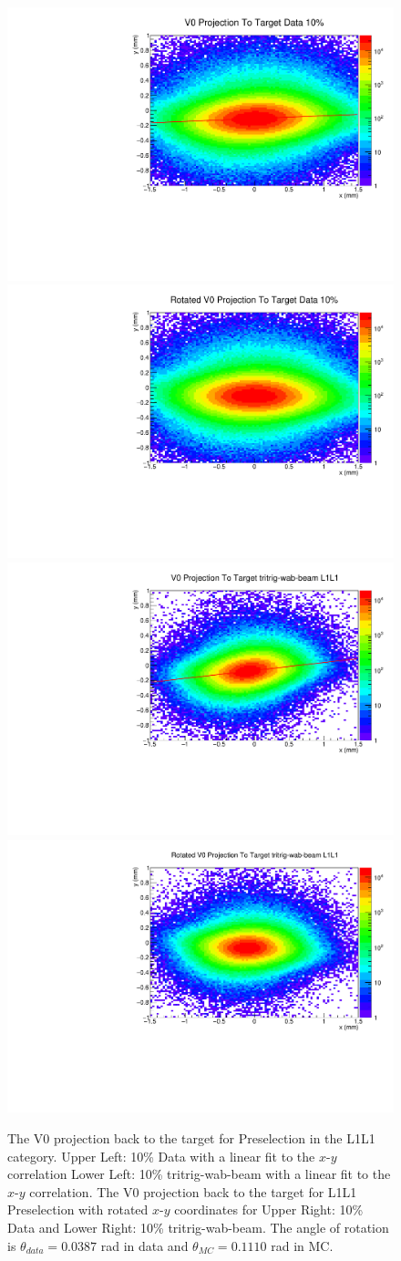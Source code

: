 \begin{figure}[t]
    \centering
    \includegraphics[width=.45\textwidth]{figs/selection/10per_data_L1L1_V0proj.pdf}
    \includegraphics[width=.45\textwidth]{figs/selection/10per_data_L1L1_V0proj_rot.pdf}
    \includegraphics[width=.45\textwidth]{figs/selection/tritrig-wab-beam_L1L1_V0plots_V0proj.pdf}
    \includegraphics[width=.45\textwidth]{figs/selection/tritrig-wab-beam_L1L1_V0plots_V0proj_rot.pdf}
    \caption{The V0 projection back to the target for Preselection in the L1L1 category. Upper Left: 10\% Data with a linear fit to the $x$-$y$ correlation Lower Left: 10\% tritrig-wab-beam with a linear fit to the $x$-$y$ correlation. The V0 projection back to the target for L1L1 Preselection with rotated $x$-$y$ coordinates for Upper Right: 10\% Data and Lower Right: 10\% tritrig-wab-beam. The angle of rotation is $\theta_{data}=0.0387$ rad in data and $\theta_{MC}=0.1110$ rad in MC. }
    \label{fig:targ_proj}
\end{figure}

